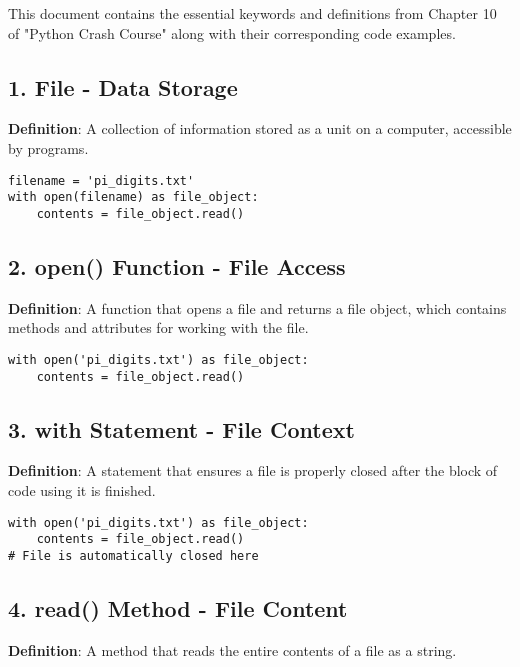 
This document contains the essential keywords and definitions from Chapter 10 of "Python Crash Course" along with their corresponding code examples.

\subsection*{1. File - Data Storage}
\textbf{Definition}: A collection of information stored as a unit on a computer, accessible by programs.

\begin{lstlisting}
filename = 'pi_digits.txt'
with open(filename) as file_object:
    contents = file_object.read()
\end{lstlisting}

\subsection*{2. open() Function - File Access}
\textbf{Definition}: A function that opens a file and returns a file object, which contains methods and attributes for working with the file.

\begin{lstlisting}
with open('pi_digits.txt') as file_object:
    contents = file_object.read()
\end{lstlisting}

\subsection*{3. with Statement - File Context}
\textbf{Definition}: A statement that ensures a file is properly closed after the block of code using it is finished.

\begin{lstlisting}
with open('pi_digits.txt') as file_object:
    contents = file_object.read()
# File is automatically closed here
\end{lstlisting}

\subsection*{4. read() Method - File Content}
\textbf{Definition}: A method that reads the entire contents of a file as a string.



